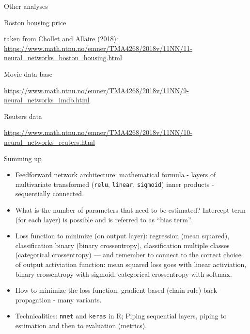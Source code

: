 \documentclass[10pt,ignorenonframetext,]{beamer}
\providecommand{\tightlist}{%
  \setlength{\itemsep}{0pt}\setlength{\parskip}{0pt}}
\begin{document}
\begin{frame}

\begin{block}{Other analyses}

\begin{block}{Boston housing price}

taken from Chollet and Allaire (2018):
\url{https://www.math.ntnu.no/emner/TMA4268/2018v/11NN/11-neural_networks_boston_housing.html}

\end{block}

\begin{block}{Movie data base}

\url{https://www.math.ntnu.no/emner/TMA4268/2018v/11NN/9-neural_networks_imdb.html}

\end{block}

\begin{block}{Reuters data}

\url{https://www.math.ntnu.no/emner/TMA4268/2018v/11NN/10-neural_networks_reuters.html}

\end{block}

\end{block}

\end{frame}

\begin{frame}[fragile]{Summing up}
\protect\hypertarget{summing-up-1}{}

\begin{itemize}
\tightlist
\item
  Feedforward network architecture: mathematical formula - layers of
  multivariate transformed (\texttt{relu}, \texttt{linear},
  \texttt{sigmoid}) inner products - sequentially connected.
\item
  What is the number of parameters that need to be estimated? Intercept
  term (for each layer) is possible and is referred to as ``bias term''.
\item
  Loss function to minimize (on output layer): regression (mean
  squared), classification binary (binary crossentropy), classification
  multiple classes (categorical crossentropy) --- and remember to
  connect to the correct choice of output activiation function: mean
  squared loss goes with linear activiation, binary crossentropy with
  sigmoid, categorical crossentropy with softmax.
\item
  How to minimize the loss function: gradient based (chain rule)
  back-propagation - many variants.
\item
  Technicalities: \texttt{nnet} and \texttt{keras} in R; Piping
  sequential layers, piping to estimation and then to evaluation
  (metrics).
\end{itemize}

\end{frame}
\end{document}

